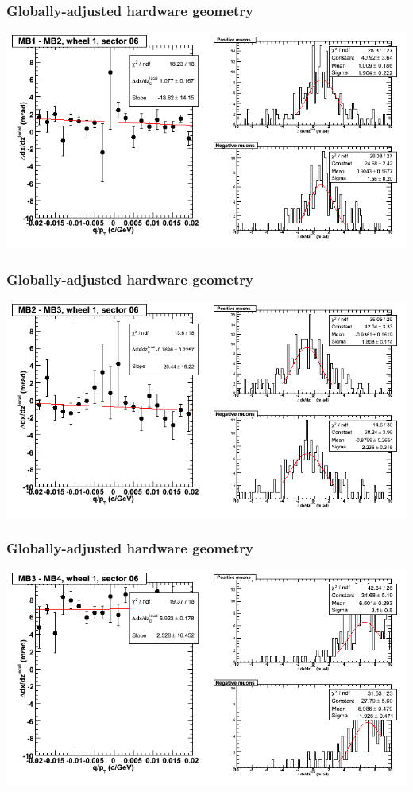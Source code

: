\documentclass[compress]{beamer}
\begin{document}
\begin{frame}
\frametitle{Globally-adjusted hardware geometry}
\includegraphics[width=\linewidth]{NOV4_segdiffs_HW/dt13_slope_D_06_12.png}
\end{frame}

\begin{frame}
\frametitle{Globally-adjusted hardware geometry}
\includegraphics[width=\linewidth]{NOV4_segdiffs_HW/dt13_slope_D_06_23.png}
\end{frame}

\begin{frame}
\frametitle{Globally-adjusted hardware geometry}
\includegraphics[width=\linewidth]{NOV4_segdiffs_HW/dt13_slope_D_06_34.png}
\end{frame}
\end{document}
